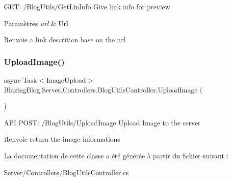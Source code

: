 G\+ET\+: /\+Blog\+Utils/\+Get\+Lin\+Info Give link info for preview 


\begin{DoxyParams}{Paramètres}
{\em url} & Url\\
\hline
\end{DoxyParams}
\begin{DoxyReturn}{Renvoie}
a link descrition base on the url
\end{DoxyReturn}
\mbox{\label{class_blazing_blog_1_1_server_1_1_controllers_1_1_blog_utils_controller_a7e2fd0bf2bf61c62ad1598d787987776}} 
\subsubsection{\texorpdfstring{Upload\+Image()}{UploadImage()}}
{\footnotesize\ttfamily async Task$<$Image\+Upload$>$ Blazing\+Blog.\+Server.\+Controllers.\+Blog\+Utils\+Controller.\+Upload\+Image (\begin{DoxyParamCaption}{ }\end{DoxyParamCaption})\hspace{0.3cm}{\ttfamily [inline]}}



A\+PI P\+O\+ST\+: /\+Blog\+Utils/\+Upload\+Image Upload Image to the server 

\begin{DoxyReturn}{Renvoie}
return the image informations
\end{DoxyReturn}


La documentation de cette classe a été générée à partir du fichier suivant \+:\begin{DoxyCompactItemize}
\item 
Server/\+Controllers/Blog\+Utils\+Controller.\+cs\end{DoxyCompactItemize}

